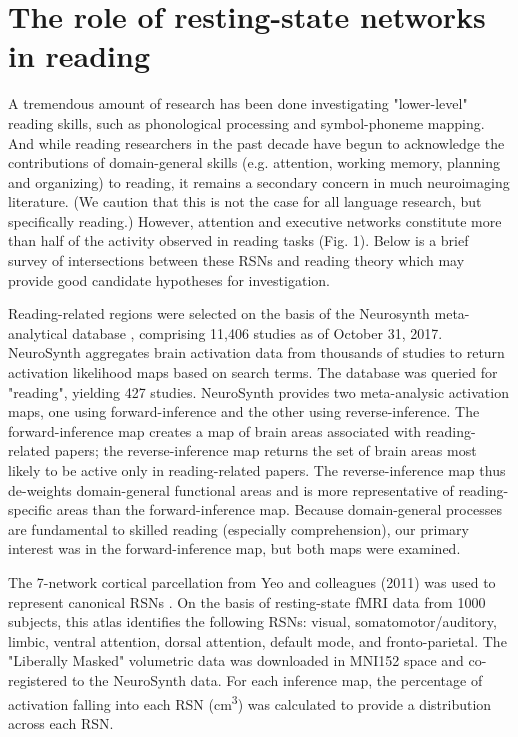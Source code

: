 \section{The role of resting-state networks in reading}
A tremendous amount of research has been done investigating "lower-level" reading skills, such as phonological processing and symbol-phoneme mapping. And while reading researchers in the past decade have begun to acknowledge the contributions of domain-general skills (e.g. attention, working memory, planning and organizing) to reading, it remains a secondary concern in much neuroimaging literature. (We caution that this is not the case for all language research, but specifically reading.) However, attention and executive networks constitute more than half of the activity observed in reading tasks (Fig. 1). Below is a brief survey of intersections between these RSNs and reading theory which may provide good candidate hypotheses for investigation.

Reading-related regions were selected on the basis of the Neurosynth meta-analytical database \cite{Yarkoni2011}, comprising 11,406 studies as of October 31, 2017. NeuroSynth aggregates brain activation data from thousands of studies to return activation likelihood maps based on search terms. The database was queried for "reading", yielding 427 studies. NeuroSynth provides two meta-analysic activation maps, one using forward-inference and the other using reverse-inference. The forward-inference map creates a map of brain areas associated with reading-related papers; the reverse-inference map returns the set of brain areas most likely to be active only in reading-related papers. The reverse-inference map thus de-weights domain-general functional areas and is more representative of reading-specific areas than the forward-inference map. Because domain-general processes are fundamental to skilled reading (especially comprehension), our primary interest was in the forward-inference map, but both maps were examined. 

The 7-network cortical parcellation from Yeo and colleagues (2011) was used to represent canonical RSNs \cite{Yeo2011}. On the basis of resting-state fMRI data from 1000 subjects, this atlas identifies the following RSNs: visual, somatomotor/auditory, limbic, ventral attention, dorsal attention, default mode, and fronto-parietal. The "Liberally Masked" volumetric data was downloaded in MNI152 space and co-registered to the NeuroSynth data. For each inference map, the percentage of activation falling into each RSN (cm\textsuperscript{3}) was calculated to provide a distribution across each RSN.

